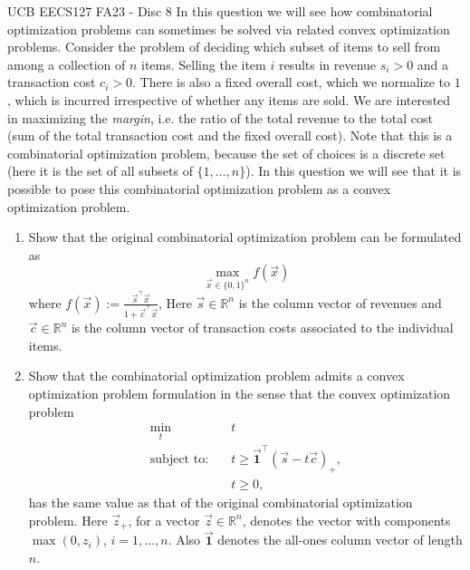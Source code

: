 \begin{problem}{}{}{UCB EECS127 FA23 - Disc 8}
In this question we will see how combinatorial optimization problems can sometimes be solved
via related convex optimization problems. Consider the problem of deciding which subset of items
to sell from among a collection of $n$ items. Selling the item $i$ results in revenue $s_i > 0$
and a transaction cost $c_i > 0$. There is also a fixed overall cost, which we normalize to $1$,
which is incurred irrespective of whether any items are sold. We are interested in maximizing the \emph{margin},
i.e. the ratio of the total revenue to the total cost (sum of the total transaction cost and the fixed overall cost).
Note that this is a combinatorial optimization problem, because the set of choices is a discrete set
(here it is the set of all subsets of $\{1, \dots, n\}$). In this question we will see that it is possible to
pose this combinatorial optimization problem as a convex optimization problem.

\begin{enumerate}
    \item[(a)] Show that the original combinatorial optimization problem can be formulated as
          \[
              \max_{\vec{x} \in \{0,1\}^n} f(\vec{x})
          \]
          where $f(\vec{x}) := \frac{\vec{s}^\top \vec{x}}{1 + \vec{c}^\top \vec{x}}$, Here $\vec{s} \in \mathbb{R}^n$ is the column
          vector of revenues and $\vec{c} \in \mathbb{R}^n$ is the column vector of transaction costs associated
          to the individual items.

    \item[(b)] Show that the combinatorial optimization problem admits a convex optimization problem formulation
          in the sense that the convex optimization problem
          \begin{align*}
              \min_t \quad             & t                                                   \\
              \text{subject to:} \quad & t \ge \vec{\mathbf{1}}^\top (\vec{s} - t\vec{c})_+, \\
                                       & t \ge 0,
          \end{align*}
          has the same value as that of the original combinatorial optimization problem. Here $\vec{z}_+$,
          for a vector $\vec{z} \in \mathbb{R}^n$, denotes the vector with components $\max(0, z_i)$, $i = 1, \dots, n$.
          Also $\vec{\mathbf{1}}$ denotes the all-ones column vector of length $n$.


\end{enumerate}
\end{problem}
